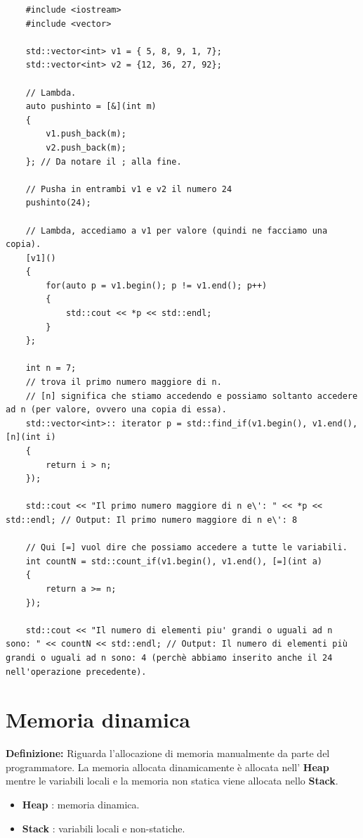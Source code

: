 \begin{lstlisting}
	#include <iostream>
	#include <vector>
	
	std::vector<int> v1 = { 5, 8, 9, 1, 7};
	std::vector<int> v2 = {12, 36, 27, 92};
	
	// Lambda.
	auto pushinto = [&](int m)
	{
		v1.push_back(m);
		v2.push_back(m);
	}; // Da notare il ; alla fine.

	// Pusha in entrambi v1 e v2 il numero 24
	pushinto(24);
	
	// Lambda, accediamo a v1 per valore (quindi ne facciamo una copia).
	[v1]()
	{
		for(auto p = v1.begin(); p != v1.end(); p++)
		{
			std::cout << *p << std::endl;
		}
	};

	int n = 7;
	// trova il primo numero maggiore di n.
	// [n] significa che stiamo accedendo e possiamo soltanto accedere ad n (per valore, ovvero una copia di essa).
	std::vector<int>:: iterator p = std::find_if(v1.begin(), v1.end(), [n](int i)
	{
		return i > n;
	});

	std::cout << "Il primo numero maggiore di n e\': " << *p << std::endl; // Output: Il primo numero maggiore di n e\': 8

	// Qui [=] vuol dire che possiamo accedere a tutte le variabili.
	int countN = std::count_if(v1.begin(), v1.end(), [=](int a) 
	{
		return a >= n;
	});

	std::cout << "Il numero di elementi piu' grandi o uguali ad n sono: " << countN << std::endl; // Output: Il numero di elementi più grandi o uguali ad n sono: 4 (perchè abbiamo inserito anche il 24 nell'operazione precedente).
\end{lstlisting}



\newpage

\section{Memoria dinamica}

\textsf{\small \textbf{Definizione: } Riguarda l'allocazione di memoria manualmente da parte del programmatore. La memoria allocata dinamicamente è allocata nell' \textbf{Heap} mentre le variabili locali e la memoria non statica viene allocata nello \textbf{Stack}.}

\begin{itemize}
	\item \textsf{\small \textbf{Heap} : memoria dinamica.}
	\item \textsf{\small \textbf{Stack} : variabili locali e non-statiche.}
\end{itemize}

